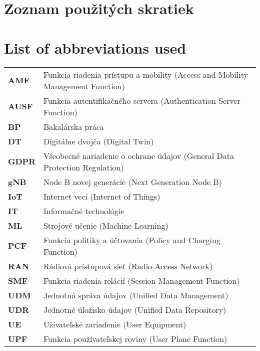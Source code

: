 \thispagestyle{plain}

\ifx\FIITlagEN\undefined
\section*{\Huge Zoznam použitých skratiek}
\else
\section*{\Huge List of abbreviations used}
\fi
\vskip 1cm

\begin{tabular}{ >{\bfseries}m{2cm} m{10cm} }
AMF     & Funkcia riadenia prístupu a mobility (Access and Mobility Management Function) \\  
AUSF    & Funkcia autentifikačného servera (Authentication Server Function) \\  
BP      & Bakalárska práca \\  
DT      & Digitálne dvojča (Digital Twin) \\  
GDPR    & Všeobecné nariadenie o ochrane údajov (General Data Protection Regulation) \\  
gNB     & Node B novej generácie (Next Generation Node B) \\  
IoT     & Internet vecí (Internet of Things) \\  
IT      & Informačné technológie \\  
ML      & Strojové učenie (Machine Learning) \\  
PCF     & Funkcia politiky a účtovania (Policy and Charging Function) \\  
RAN     & Rádiová prístupová sieť (Radio Access Network) \\  
SMF     & Funkcia riadenia relácií (Session Management Function) \\  
UDM     & Jednotná správa údajov (Unified Data Management) \\  
UDR     & Jednotné úložisko údajov (Unified Data Repository) \\  
UE      & Užívateľské zariadenie (User Equipment) \\  
UPF     & Funkcia používateľskej roviny (User Plane Function) \\  
\end{tabular}

\emptypage